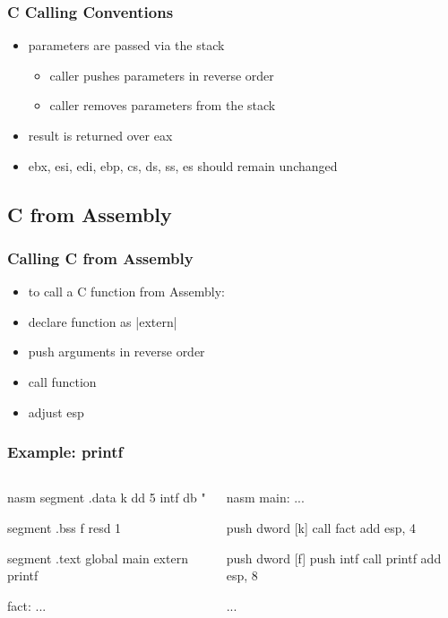 \documentclass[dvipsnames]{beamer}
\begin{document}
\begin{frame}
  \frametitle{C Calling Conventions}

  \begin{itemize}
    \item parameters are passed via the stack
    \begin{itemize}
      \item caller pushes parameters in reverse order
      \item caller removes parameters from the stack
    \end{itemize}

    \item result is returned over eax

    \item ebx, esi, edi, ebp, cs, ds, ss, es should remain unchanged
  \end{itemize}
\end{frame}

\subsection{C from Assembly}

\begin{frame}
  \frametitle{Calling C from Assembly}

  \begin{itemize}
    \item to call a C function from Assembly:

    \medskip
    \item declare function as |extern|
    \item push arguments in reverse order
    \item call function
    \item adjust esp
  \end{itemize}
\end{frame}

\begin{frame}[fragile]
  \frametitle{Example: printf}

  \begin{columns}[t]
    \begin{pygments}{nasm}
segment .data
k    dd   5
intf db   "%

segment .bss
f    resd 1

segment .text
global main
extern printf

fact:
    ...
    \end{pygments}

    \begin{pygments}{nasm}
main:
    ...

    push dword [k]
    call fact
    add  esp, 4

    push dword [f]
    push intf
    call printf
    add  esp, 8

    ...
    \end{pygments}
  \end{columns}
\end{frame}
\end{document}
